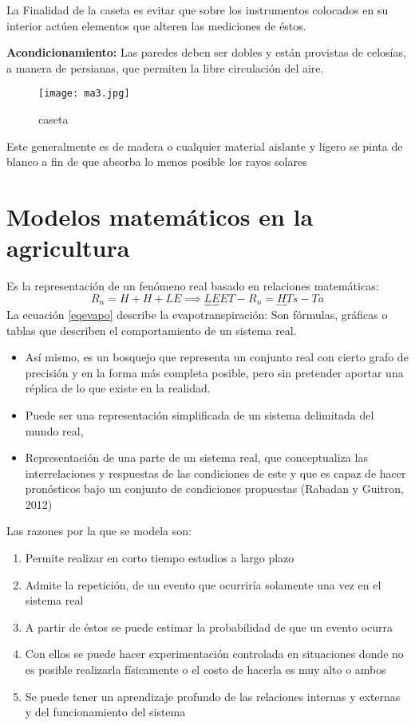 La Finalidad de la caseta es evitar que sobre los instrumentos colocados en su interior actúen elementos que alteren las mediciones de éstos.

\textbf{Acondicionamiento:} Las paredes deben ser dobles y están provistas de celosías, a manera de persianas, que permiten la libre circulación del aire.
    \begin{figure}[h!]
    \centering
      \texttt{[image: ma3.jpg]}
      \caption{caseta}
      \label{ma3}
    \end{figure}
Este generalmente es de madera o cualquier material aislante y ligero se pinta de blanco a fin de que absorba lo menos posible los rayos solares

\section{Modelos matemáticos en la agricultura}

Es la representación de un fenómeno real basado en relaciones matemáticas:
\begin{equation}
  R_n = H + H + LE\implies \underbrace{LE}{ET} - R_n = \underbrace{H}{Ts - Ta}
  \label{eqevapo}
\end{equation}
La ecuación \eqref{eqevapo} describe la evapotranspiración: Son fórmulas, gráficas o tablas que describen el comportamiento de un sistema real.
\begin{itemize}
  \item Así mismo, es un bosquejo que representa un conjunto real con cierto grafo de precisión y en la forma más completa posible, pero sin pretender aportar una réplica de lo que existe en la realidad.
  \item Puede ser una representación simplificada de un sistema delimitada del mundo real,
  \item Representación de una parte de un sistema real, que conceptualiza las interrelaciones y respuestas de las condiciones de este y que es capaz de hacer pronósticos bajo un conjunto de condiciones propuestas (Rabadan y Guitron, 2012)  
\end{itemize}

Las razones por la que se modela son:
\begin{enumerate}
  \item Permite realizar en corto tiempo estudios a largo plazo
  \item Admite la repetición, de un evento que ocurriría solamente una vez en el sistema real
  \item A partir de éstos se puede estimar la probabilidad de que un evento ocurra
  \item Con ellos se puede hacer experimentación controlada en situaciones donde no es posible realizarla físicamente o el costo de hacerla es muy alto o ambos
  \item Se puede tener un aprendizaje profundo de las relaciones internas y externas y del funcionamiento del sistema
\end{enumerate}

